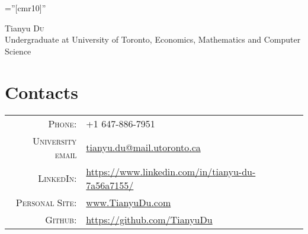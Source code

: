 \documentclass[a4paper,10pt]{article}
\begin{document}

\pagestyle{empty} %

\font\fb=''[cmr10]'' %

\par{\centering
		{\Huge Tianyu \textsc{Du} \\
		\small Undergraduate at University of Toronto, Economics, Mathematics and Computer Science
	}\bigskip\par}

\section{Contacts}

\begin{tabular}{rl}
    \textsc{Phone:} & +1 647-886-7951\\
    \textsc{University email} & \href{mailto:tianyu.du@mail.utoronto.ca}{tianyu.du@mail.utoronto.ca} \\
    \textsc{LinkedIn:} & \href{https://www.linkedin.com/in/tianyu-du-7a56a7155/}{https://www.linkedin.com/in/tianyu-du-7a56a7155/} \\
    \textsc{Personal Site:} & \href{www.tianyudu.com}{www.TianyuDu.com} \\
    \textsc{Github:} & \href{https://github.com/TianyuDu}{https://github.com/TianyuDu}
\end{tabular}
\end{document}
